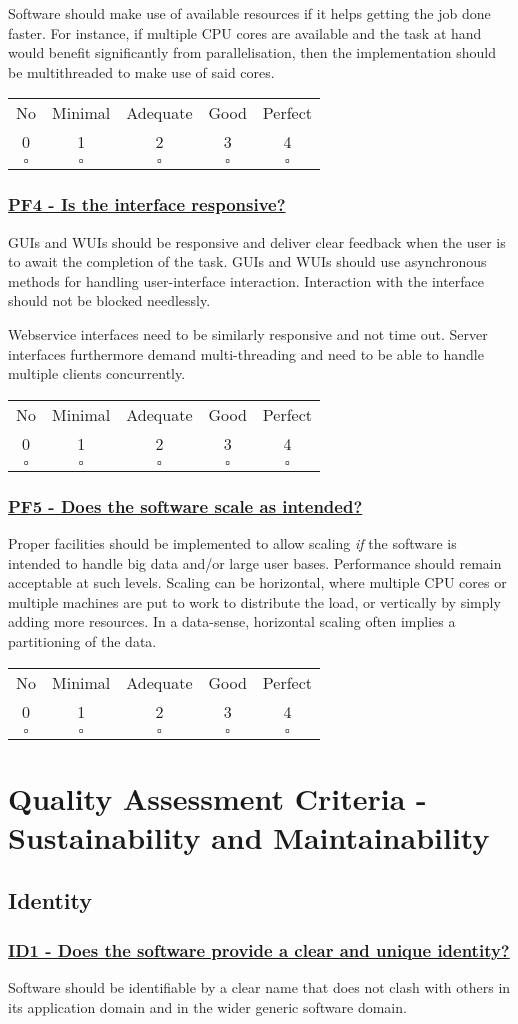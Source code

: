 \documentclass[a4paper,11pt]{article}
\newcommand{\criterion}[2]{\subsubsection*{\underline{#1 - #2}}\label{id:#1}}
\newcommand\CheckTable{%
  \begin{tabular}{ccccc}
    No & Minimal & Adequate & Good & Perfect \\
    0 & 1 & 2 & 3 & 4 \\
    \hline
    $\square$ & $\square$ & $\square$ & $\square$ & $\square$ \\
  \end{tabular}%
}
\begin{document}
Software should make use of available resources if it helps getting the job
done faster. For instance, if multiple CPU cores are available and the task at hand
would benefit significantly from parallelisation, then the implementation should be
multithreaded to make use of said cores.

\CheckTable

\newcommand{\pfFourID}{PF4}
\newcommand{\pfFourText}{Is the interface responsive?}
\criterion{\pfFourID}{\pfFourText}

GUIs and WUIs should be responsive and deliver clear feedback when the user is
to await the completion of the task. GUIs and WUIs should use asynchronous methods for
handling user-interface interaction. Interaction with the interface should not
be blocked needlessly.

Webservice interfaces need to be similarly responsive and not time out. Server interfaces furthermore demand multi-threading and need to be able to handle
multiple clients concurrently.

\CheckTable

\newcommand{\pfFiveID}{PF5}
\newcommand{\pfFiveText}{Does the software scale as intended?}
\criterion{\pfFiveID}{\pfFiveText}

Proper facilities should be implemented to allow scaling \emph{if} the software is
intended to handle big data and/or large user bases. Performance should remain
acceptable at such levels.  Scaling can be horizontal, where multiple CPU cores
or multiple machines are put to work to distribute the load, or vertically by
simply adding more resources. In a data-sense, horizontal scaling often implies
a partitioning of the data.

\CheckTable

\section{Quality Assessment Criteria - Sustainability and Maintainability}\label{sec:sustAndMaint}

\subsection{Identity}\label{sec:ide}

\newcommand{\idOneID}{ID1}
\newcommand{\idOneText}{Does the software provide a clear and unique identity?}
\criterion{\idOneID}{\idOneText}

Software should be identifiable by a clear name that does not clash with others
in its application domain and in the wider generic software domain. 
\end{document}
